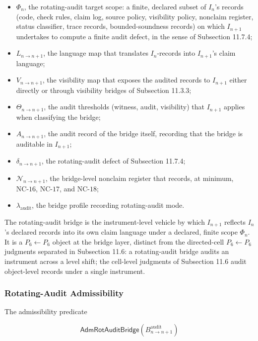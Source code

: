 \documentclass[11pt]{article}
\providecommand{\tightlist}{}
\theoremstyle{definition}
\begin{document}
\begin{itemize}
\tightlist
\item
  \(\Phi_n\), the rotating-audit target scope: a finite, declared subset of \(I_n\)'s records (code, check rules, claim log, source policy, visibility policy, nonclaim register, status classifier, trace records, bounded-soundness records) on which \(I_{n+1}\) undertakes to compute a finite audit defect, in the sense of Subsection 11.7.4;
\item
  \(L_{n\to n+1}\), the language map that translates \(I_n\)-records into \(I_{n+1}\)'s claim language;
\item
  \(V_{n\to n+1}\), the visibility map that exposes the audited records to \(I_{n+1}\) either directly or through visibility bridges of Subsection 11.3.3;
\item
  \(\Theta_{n\to n+1}\), the audit thresholds (witness, audit, visibility) that \(I_{n+1}\) applies when classifying the bridge;
\item
  \(A_{n\to n+1}\), the audit record of the bridge itself, recording that the bridge is auditable in \(I_{n+1}\);
\item
  \(\delta_{n\to n+1}\), the rotating-audit defect of Subsection 11.7.4;
\item
  \(\mathcal N_{n\to n+1}\), the bridge-level nonclaim register that records, at minimum, \(\mathrm{NC}\text{-}16\), \(\mathrm{NC}\text{-}17\), and \(\mathrm{NC}\text{-}18\);
\item
  \(\lambda_{\mathrm{audit}}\), the bridge profile recording rotating-audit mode.
\end{itemize}

The rotating-audit bridge is the instrument-level vehicle by which \(I_{n+1}\) reflects \(I_n\)'s declared records into its own claim language under a declared, finite scope \(\Phi_n\). It is a \(P_6\leftarrow P_6\) object at the bridge layer, distinct from the directed-cell \(P_6\leftarrow P_6\) judgments separated in Subsection 11.6: a rotating-audit bridge audits an instrument across a level shift; the cell-level judgments of Subsection 11.6 audit object-level records under a single instrument.

\subsubsection{Rotating-Audit Admissibility}

The admissibility predicate

\[
\mathsf{AdmRotAuditBridge}(B^{\mathrm{audit}}_{n\to n+1})
\]
\end{document}
